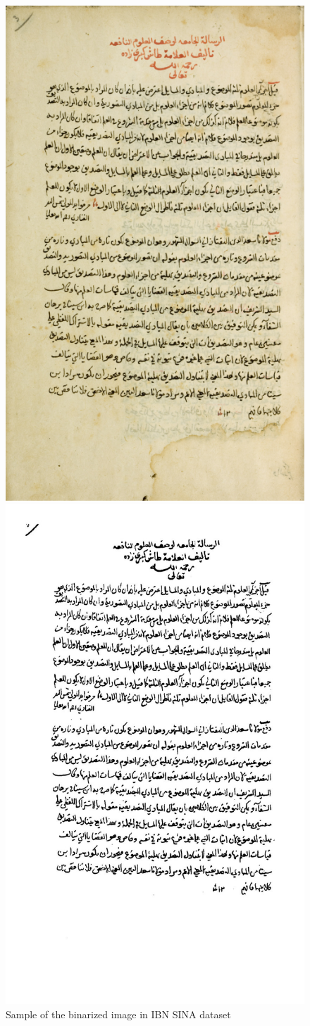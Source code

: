 \begin{figure}[!htb]
    \centering
    \begin{minipage}{0.45\linewidth}
        \centering
        \includegraphics[width=0.7\linewidth, height=0.9\linewidth]{images/IBN SINA original image.png} %
        \caption{Sample of the original image in IBN SINA dataset}
        \label{fig:adaptive-gaussian}
    \end{minipage}\hfill
    \begin{minipage}{0.45\linewidth}
        \centering
        \includegraphics[width=0.7\linewidth, height=0.9\linewidth]{images/IBN_SINA binarized sample.png} %
        \caption{Sample of the binarized image in IBN SINA dataset}
        \label{fig:IBN_SINA binarized sample}
    \end{minipage}
\end{figure}


